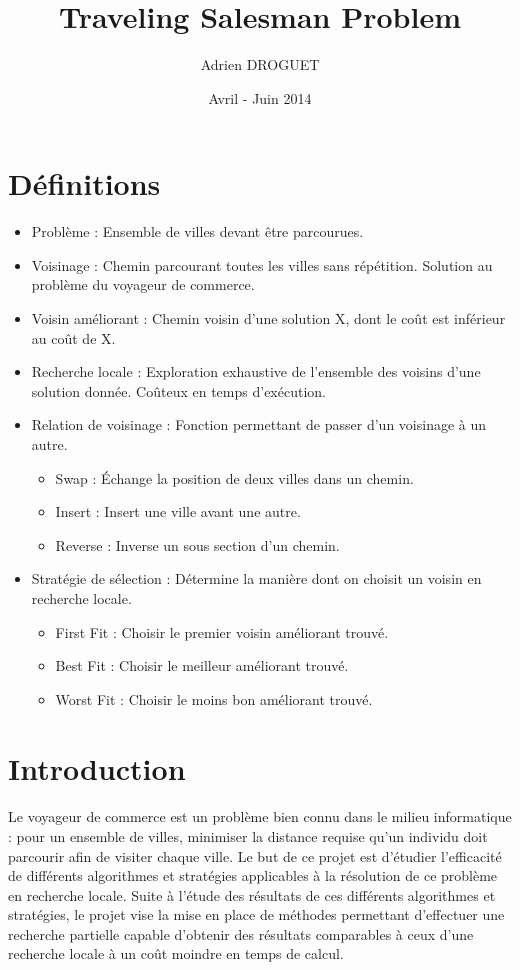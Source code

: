 \documentclass[a4paper,10pt]{report}
\title{Traveling Salesman Problem}
\author{Adrien DROGUET}
\date{Avril - Juin 2014}
\begin{document}
\maketitle

\tableofcontents
\pagebreak

\section{Définitions}
\begin{itemize}
 \item Problème : Ensemble de villes devant être parcourues.
 \item Voisinage : Chemin parcourant toutes les villes sans répétition. Solution au problème du voyageur de commerce.
 \item Voisin améliorant : Chemin voisin d'une solution X, dont le coût est inférieur au coût de X.
 \item Recherche locale : Exploration exhaustive de l'ensemble des voisins d'une solution donnée.
 Coûteux en temps d'exécution.
 \item Relation de voisinage : Fonction permettant de passer d'un voisinage à un autre.
 \begin{itemize}
  \item Swap : Échange la position de deux villes dans un chemin.
  \item Insert : Insert une ville avant une autre.
  \item Reverse : Inverse un sous section d'un chemin.
 \end{itemize}
 \item Stratégie de sélection : Détermine la manière dont on choisit un voisin en recherche locale.
 \begin{itemize}
  \item First Fit : Choisir le premier voisin améliorant trouvé.
  \item Best Fit : Choisir le meilleur améliorant trouvé.
  \item Worst Fit : Choisir le moins bon améliorant trouvé.
 \end{itemize}
\end{itemize}


\section{Introduction}

\paragraph{} %
  Le voyageur de commerce est un problème bien connu dans le milieu informatique : pour un ensemble de villes,
minimiser la distance requise qu'un individu doit parcourir afin de visiter chaque ville. Le but de ce projet
est d'étudier l'efficacité de différents algorithmes et stratégies applicables à la résolution de ce problème
en recherche locale. Suite à l'étude des résultats de ces différents algorithmes et stratégies, le projet vise la mise
en place de méthodes permettant d'effectuer une recherche partielle capable d'obtenir des résultats comparables
à ceux d'une recherche locale à un coût moindre en temps de calcul.
\end{document}
